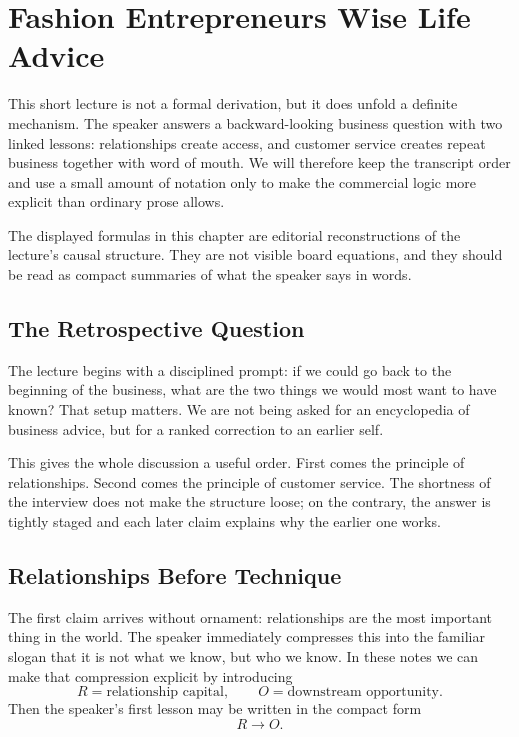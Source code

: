\chapter{Fashion Entrepreneurs Wise Life Advice}

This short lecture is not a formal derivation, but it does unfold a definite mechanism. The speaker answers a backward-looking business question with two linked lessons: relationships create access, and customer service creates repeat business together with word of mouth. We will therefore keep the transcript order and use a small amount of notation only to make the commercial logic more explicit than ordinary prose allows.

\begin{remark}
The displayed formulas in this chapter are editorial reconstructions of the lecture's causal structure. They are not visible board equations, and they should be read as compact summaries of what the speaker says in words.
\end{remark}

\section{The Retrospective Question}

The lecture begins with a disciplined prompt: if we could go back to the beginning of the business, what are the two things we would most want to have known? That setup matters. We are not being asked for an encyclopedia of business advice, but for a ranked correction to an earlier self.

This gives the whole discussion a useful order. First comes the principle of relationships. Second comes the principle of customer service. The shortness of the interview does not make the structure loose; on the contrary, the answer is tightly staged and each later claim explains why the earlier one works.

\section{Relationships Before Technique}

The first claim arrives without ornament: relationships are the most important thing in the world. The speaker immediately compresses this into the familiar slogan that it is not what we know, but who we know. In these notes we can make that compression explicit by introducing
\[
R = \text{relationship capital},
\qquad
O = \text{downstream opportunity}.
\]
Then the speaker's first lesson may be written in the compact form
\begin{equation}
R \to O.
\end{equation}

